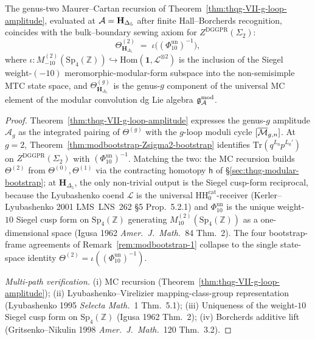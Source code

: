 \begin{theorem}
\label{thm:modbootstrap-MC-equals-bootstrap}
The genus-two Maurer--Cartan recursion of
Theorem~\ref{thm:thqg-VII-g-loop-amplitude}, evaluated at
$\mathcal{A} = \mathbf H_{\Delta_5}$ after finite Hall--Borcherds recognition,
coincides with the bulk--boundary sewing
axiom for $Z^{\mathrm{DGGPR}}(\Sigma_2)$:
\[
 \Theta^{(2)}_{\mathbf H_{\Delta_5}}
 \;=\;
 \iota\bigl((\Phi_{10}^{\mathrm{un}})^{-1}\bigr),
\]
where $\iota\colon M^{(2)}_{-10}(\mathrm{Sp}_4(\mathbb Z))\hookrightarrow
\mathrm{Hom}(\mathbf 1, \mathcal L^{\otimes 2})$ is the inclusion of
the Siegel weight-$(-10)$ meromorphic-modular-form subspace into the
non-semisimple MTC state space, and
$\Theta^{(g)}_{\mathbf H_{\Delta_5}}$ is the genus-$g$ component of the
universal MC element of the modular convolution dg Lie algebra
$\mathfrak{g}_{\mathcal{A}}^{\mathrm{mod}}$.
\end{theorem}

\begin{proof}
Theorem~\ref{thm:thqg-VII-g-loop-amplitude} expresses the genus-$g$
amplitude $\mathcal A_g$ as the integrated pairing of $\Theta^{(g)}$ with
the $g$-loop moduli cycle $[\overline{\mathcal{M}}_{g,n}]$. At $g=2$,
Theorem~\ref{thm:modbootstrap-Zsigma2-bootstrap} identifies
$\mathrm{Tr}(q^{L_0}p^{L_0'})$ on $Z^{\mathrm{DGGPR}}(\Sigma_2)$ with
$(\Phi_{10}^{\mathrm{un}})^{-1}$. Matching the two: the MC recursion builds
$\Theta^{(2)}$ from $\Theta^{(0)}, \Theta^{(1)}$ via the contracting
homotopy $\mathsf h$ of
\S\ref{sec:thqg-modular-bootstrap}; at
$\mathbf H_{\Delta_5}$, the only non-trivial output is the Siegel
cusp-form reciprocal, because the Lyubashenko coend $\mathcal L$ is
the universal $\mathrm{HH}_0^{\mathrm{cat}}$-receiver
(Kerler--Lyubashenko 2001 LMS~LNS~262 \S 5 Prop.~5.2.1) and
$\Phi_{10}^{\mathrm{un}}$ is the unique weight-$10$ Siegel cusp form on
$\mathrm{Sp}_4(\mathbb Z)$ generating
$M^{(2)}_{10}(\mathrm{Sp}_4(\mathbb Z))$ as a one-dimensional space
(Igusa 1962 \emph{Amer.~J.~Math.}~84 Thm.~2).
The four bootstrap-frame agreements of
Remark~\ref{rem:modbootstrap-1} collapse to the single
state-space identity
$\Theta^{(2)} = \iota((\Phi_{10}^{\mathrm{un}})^{-1})$.

\emph{Multi-path verification.}
(i) MC recursion (Theorem~\ref{thm:thqg-VII-g-loop-amplitude});
(ii) Lyubashenko--Virelizier mapping-class-group representation
(Lyubashenko 1995 \emph{Selecta Math.}~1 Thm.~5.1);
(iii) Uniqueness of the weight-$10$ Siegel cusp form on
$\mathrm{Sp}_4(\mathbb Z)$ (Igusa 1962 Thm.~2);
(iv) Borcherds additive lift
(Gritsenko--Nikulin 1998 \emph{Amer.~J.~Math.}~120 Thm.~3.2).
\end{proof}

